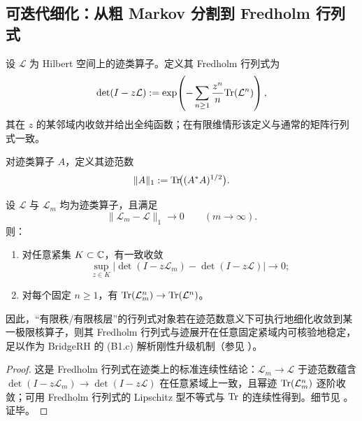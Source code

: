 \subsection{可迭代细化：从粗 Markov 分割到 Fredholm 行列式}\label{subsec:transfer-operator-refinement-bridge}

\begin{definition}\label{def:fredholm-determinant-bridge}
设 \(\mathcal{L}\) 为 Hilbert 空间上的迹类算子。定义其 Fredholm 行列式为
$$
\det(I-z\mathcal{L})
:=\exp\!\left(-\sum_{n\ge 1}\frac{z^n}{n}\mathrm{Tr}(\mathcal{L}^n)\right),
$$
其在 \(z\) 的某邻域内收敛并给出全纯函数；在有限维情形该定义与通常的矩阵行列式一致。
\end{definition}

\begin{definition}[迹范数]\label{def:trace-norm-bridge}
对迹类算子 \(A\)，定义其迹范数
$$
\|A\|_1:=\mathrm{Tr}\!\bigl((A^\ast A)^{1/2}\bigr).
$$
\end{definition}

\begin{proposition}\label{prop:fredholm-det-trace-norm-continuity}
设 \(\mathcal{L}\) 与 \(\mathcal{L}_m\) 均为迹类算子，且满足
$$
\|\mathcal{L}_m-\mathcal{L}\|_1\to 0\qquad(m\to\infty).
$$
则：
\begin{enumerate}
  \item 对任意紧集 \(K\subset\mathbb{C}\)，有一致收敛
  $$
  \sup_{z\in K}\bigl|\det(I-z\mathcal{L}_m)-\det(I-z\mathcal{L})\bigr|\to 0;
  $$
  \item 对每个固定 \(n\ge 1\)，有 \(\mathrm{Tr}(\mathcal{L}_m^n)\to \mathrm{Tr}(\mathcal{L}^n)\)。
\end{enumerate}
因此，“有限秩/有限核层”的行列式对象若在迹范数意义下可执行地细化收敛到某一极限核算子，则其 Fredholm 行列式与迹展开在任意固定紧域内可核验地稳定，足以作为 BridgeRH 的 (B1.c) 解析刚性升级机制（参见 \cite{Simon2005TraceIdeals}）。
\end{proposition}

\begin{proof}
这是 Fredholm 行列式在迹类上的标准连续性结论：\(\mathcal{L}_m\to\mathcal{L}\) 于迹范数蕴含 \(\det(I-z\mathcal{L}_m)\to \det(I-z\mathcal{L})\) 在任意紧域上一致，且幂迹 \(\mathrm{Tr}(\mathcal{L}_m^n)\) 逐阶收敛；可用 Fredholm 行列式的 Lipschitz 型不等式与 \(\mathrm{Tr}\) 的连续性得到。细节见 \cite[Chapter~3]{Simon2005TraceIdeals}。证毕。
\end{proof}

